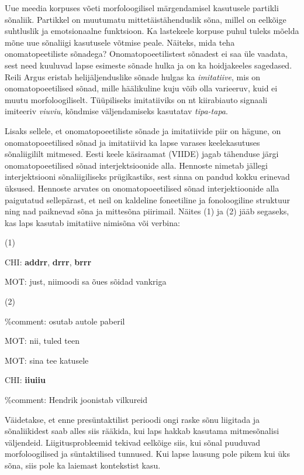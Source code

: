 \documentclass[12pt]{article}
\begin{document}
Uue meedia korpuses võeti morfoloogilisel märgendamisel kasutusele partikli sõnaliik. Partikkel on muutumatu mittetäistähenduslik sõna, millel on eelkõige suhtluslik ja emotsionaalne funktsioon. \citep[4]{UUSMEEDIA} Ka lastekeele korpuse puhul tuleks mõelda mõne uue sõnaliigi kasutusele võtmise peale. Näiteks, mida teha onomatopeetiliste sõnadega? Onomatopoeetilistest sõnadest ei saa üle vaadata, sest need kuuluvad lapse esimeste sõnade hulka ja on ka hoidjakeeles sagedased. Reili Argus eristab helijäljenduslike sõnade hulgas ka \emph{imitatiive}, mis on onomatopoeetilised sõnad, mille häälikuline kuju võib olla varieeruv, kuid ei muutu morfoloogiliselt. Tüüpiliseks imitatiiviks on nt kiirabiauto signaali imiteeriv \emph{viuviu}, kõndmise väljendamiseks kasutatav \emph{tipa-tapa}. \citep[19--22]{IMITATIIV}

Lisaks sellele, et onomatopoeetiliste sõnade ja imitatiivide piir on hägune, on onomatopoeetilised sõnad ja imitatiivid ka lapse varases keelekasutuses sõnaliigililt mitmesed. \citep[20--21]{IMITATIIV} Eesti keele käsiraamat (VIIDE) jagab tähenduse järgi onomatopoeetilised sõnad interjektsioonide alla. Hennoste nimetab jällegi interjektsiooni sõnaliigiliseks prügikastiks, sest sinna on pandud kokku erinevad üksused. Hennoste arvates on onomatopoeetilised sõnad interjektioonide alla paigutatud sellepärast, et neil on kaldeline foneetiline ja fonoloogiline struktuur ning nad paiknevad sõna ja mittesõna piirimail. \citep[67]{Hennoste} Näites (1) ja (2) jääb segaseks, kas laps kasutab imitatiive nimisõna või verbina:

(1)
\begin{description}
    \item *CHI: \textbf{addrr}, \textbf{drrr}, \textbf{brrr}
    \item *MOT: just, niimoodi sa õues sõidad vankriga \citep[27]{IMITATIIV}
\end{description}

(2)

\%comment: osutab autole paberil
\begin{description}
    \item *MOT: nii, tuled teen
    \item *MOT: sina tee katusele
    \item *CHI: \textbf{iiuiiu}
\end{description}
\%comment: Hendrik joonistab vilkureid \citep[28]{IMITATIIV}

Väidetakse, et enne presüntaktilist perioodi ongi raske sõnu liigitada ja sõnaliikidest saab alles siis rääkida, kui laps hakkab kasutama mitmesõnalisi väljendeid. Liigitusprobleemid tekivad eelkõige siis, kui sõnal puuduvad morfoloogilised ja süntaktilised tunnused. Kui lapse lausung pole pikem kui üks sõna, siis pole ka laiemast kontekstist kasu. \citep[27--29]{IMITATIIV}
\end{document}
